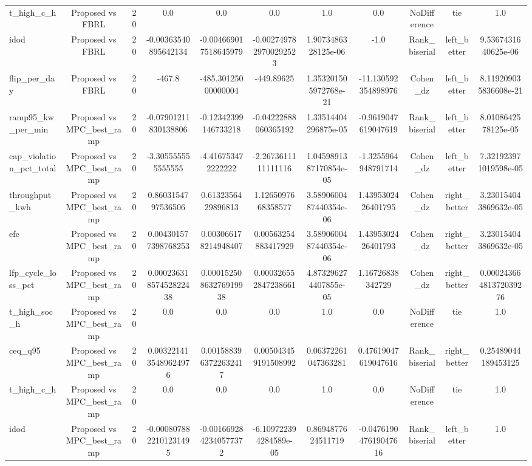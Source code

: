 \begin{table}[t]
\begin{tabular}{lcccccccccc}
t\_high\_c\_h & Proposed vs FBRL & 20 & 0.0 & 0.0 & 0.0 & 1.0 & 0.0 & NoDifference & tie & 1.0 \\
idod & Proposed vs FBRL & 20 & -0.00363540895642134 & -0.004669017518645979 & -0.0027497829700292523 & 1.9073486328125e-06 & -1.0 & Rank\_biserial & left\_better & 9.5367431640625e-06 \\
flip\_per\_day & Proposed vs FBRL & 20 & -467.8 & -485.30125000000004 & -449.89625 & 1.353201505972768e-21 & -11.130592354898976 & Cohen\_dz & left\_better & 8.119209035836608e-21 \\
ramp95\_kw\_per\_min & Proposed vs MPC\_best\_ramp & 20 & -0.07901211830138806 & -0.12342399146733218 & -0.04222888060365192 & 1.33514404296875e-05 & -0.9619047619047619 & Rank\_biserial & left\_better & 8.0108642578125e-05 \\
cap\_violation\_pct\_total & Proposed vs MPC\_best\_ramp & 20 & -3.305555555555555 & -4.416753472222222 & -2.2673611111111116 & 1.0459891387170854e-05 & -1.3255964948791714 & Cohen\_dz & left\_better & 7.321923971019598e-05 \\
throughput\_kwh & Proposed vs MPC\_best\_ramp & 20 & 0.8603154797536506 & 0.6132356429896813 & 1.1265097668358577 & 3.5890600487440354e-06 & 1.4395302426401795 & Cohen\_dz & right\_better & 3.230154043869632e-05 \\
efc & Proposed vs MPC\_best\_ramp & 20 & 0.004301577398768253 & 0.003066178214948407 & 0.00563254883417929 & 3.5890600487440354e-06 & 1.4395302426401793 & Cohen\_dz & right\_better & 3.230154043869632e-05 \\
lfp\_cycle\_loss\_pct & Proposed vs MPC\_best\_ramp & 20 & 0.00023631857452822438 & 0.00015250863276919938 & 0.000326552847238661 & 4.873296274407855e-05 & 1.16726838342729 & Cohen\_dz & right\_better & 0.00024366481372039276 \\
t\_high\_soc\_h & Proposed vs MPC\_best\_ramp & 20 & 0.0 & 0.0 & 0.0 & 1.0 & 0.0 & NoDifference & tie & 1.0 \\
ceq\_q95 & Proposed vs MPC\_best\_ramp & 20 & 0.0032214135489624976 & 0.0015883963722632417 & 0.005043459191508992 & 0.06372261047363281 & 0.47619047619047616 & Rank\_biserial & right\_better & 0.25489044189453125 \\
t\_high\_c\_h & Proposed vs MPC\_best\_ramp & 20 & 0.0 & 0.0 & 0.0 & 1.0 & 0.0 & NoDifference & tie & 1.0 \\
idod & Proposed vs MPC\_best\_ramp & 20 & -0.0008078822101231495 & -0.0016692842340577372 & -6.109722394284589e-05 & 0.8694877624511719 & -0.047619047619047616 & Rank\_biserial & left\_better & 1.0 \\

\end{tabular}
\end{table}
